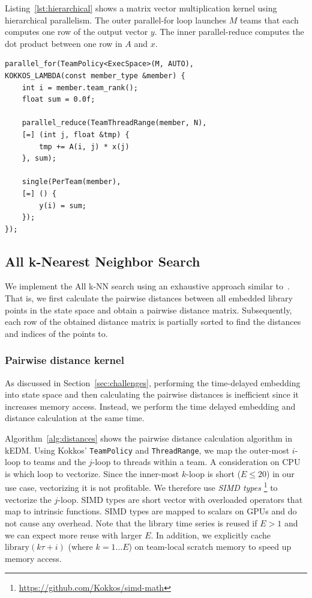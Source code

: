 \documentclass[conference]{IEEEtran}
\begin{document}
Listing~\ref{lst:hierarchical} shows a matrix vector multiplication kernel
using hierarchical parallelism. The outer parallel-for loop launches $M$ teams
that each computes one row of the output vector $y$. The inner parallel-reduce
computes the dot product between one row in $A$ and $x$.

\begin{lstlisting}[caption={Hierarchical data parallel loop},label={lst:hierarchical}]
parallel_for(TeamPolicy<ExecSpace>(M, AUTO),
KOKKOS_LAMBDA(const member_type &member) {
    int i = member.team_rank();
    float sum = 0.0f;

    parallel_reduce(TeamThreadRange(member, N),
    [=] (int j, float &tmp) {
        tmp += A(i, j) * x(j)
    }, sum);

    single(PerTeam(member),
    [=] () {
        y(i) = sum;
    });
});
\end{lstlisting}

\subsection{All k-Nearest Neighbor Search}

We implement the All k-NN search using an exhaustive approach similar
to~\cite{Garcia2008,Garcia2010}. That is, we first calculate the pairwise
distances between all embedded library points in the state space and obtain a
pairwise distance matrix. Subsequently, each row of the obtained distance
matrix is partially sorted to find the distances and indices of the points to.

\subsubsection{Pairwise distance kernel}
As discussed in Section~\ref{sec:challenges}, performing the time-delayed
embedding into state space and then calculating the pairwise distances is
inefficient since it increases memory access. Instead, we perform the time
delayed embedding and distance calculation at the same time.

Algorithm~\ref{alg:distances} shows the pairwise distance calculation
algorithm in kEDM\@. Using Kokkos' \texttt{TeamPolicy} and
\texttt{ThreadRange}, we map the outer-most $i$-loop to teams and the $j$-loop to
threads within a team. A consideration on CPU is which loop to vectorize.
Since the inner-most $k$-loop is short ($E \leq 20$) in our use case,
vectorizing it is not profitable. We therefore use \textit{SIMD types}
\footnote{\url{https://github.com/Kokkos/simd-math}} to vectorize the
$j$-loop. SIMD types are short vector with overloaded operators that map to
intrinsic functions. SIMD types are mapped to scalars on GPUs and do not cause
any overhead.
Note that the library time series is reused if $E > 1$ and we can expect
more reuse with larger $E$. In addition, we explicitly cache $\mathrm{library}
(k \tau + i)$ (where $k=1 \dots E$) on team-local scratch memory to speed up
memory access.
\end{document}
